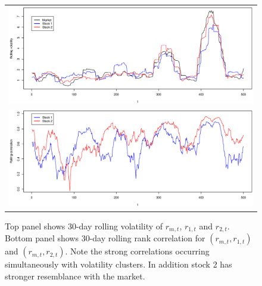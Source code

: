 \documentclass[authoryear]{elsarticle}
\begin{document}
\begin{figure}
  \begin{center}
    \begin{tabular}{c}
      {\includegraphics[scale=0.35]{rollingvolatility.eps}} \\
       {\includegraphics[scale=0.35]{rollingcorrelation.eps}} \\
            \end{tabular}
    \caption{Top panel shows 30-day rolling volatility of $r_{m,t}$, $r_{1,t}$ and $r_{2,t}$. Bottom panel shows 30-day rolling rank correlation for $(r_{m,t},r_{1,t})$ and $(r_{m,t},r_{2,t})$. Note the strong correlations occurring simultaneously with volatility clusters. In addition stock 2 has stronger resemblance with the market.}
    \label{finterpretation}
  \end{center}
\end{figure}
\end{document}
